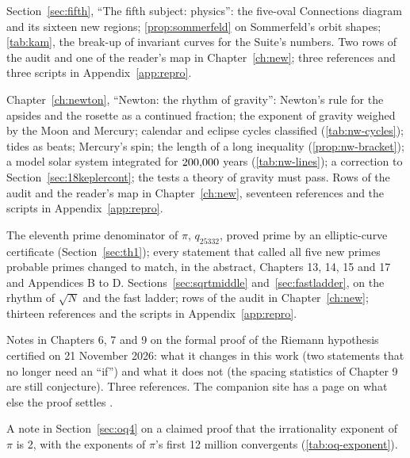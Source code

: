 \begin{description}[style=nextline,leftmargin=2em]
\item[\revE{}] Section~\ref{sec:fifth}, ``The fifth subject: physics'': the five-oval Connections diagram and its sixteen new regions; \cref{prop:sommerfeld} on Sommerfeld's orbit shapes; \cref{tab:kam}, the break-up of invariant curves for the Suite's numbers. Two rows of the audit and one of the reader's map in Chapter~\ref{ch:new}; three references and three scripts in Appendix~\ref{app:repro}.
\item[\revF{}] Chapter~\ref{ch:newton}, ``Newton: the rhythm of gravity'': Newton's rule for the apsides and the rosette as a continued fraction; the exponent of gravity weighed by the Moon and Mercury; calendar and eclipse cycles classified (\cref{tab:nw-cycles}); tides as beats; Mercury's spin; the length of a long inequality (\cref{prop:nw-bracket}); a model solar system integrated for $200{,}000$ years (\cref{tab:nw-lines}); a correction to Section~\ref{sec:18keplercont}; the tests a theory of gravity must pass. Rows of the audit and the reader's map in Chapter~\ref{ch:new}, seventeen references and the scripts in Appendix~\ref{app:repro}.
\item[\revG{}] The eleventh prime denominator of $\pi$, $q_{25332}$, proved prime by an elliptic-curve certificate (Section~\ref{sec:th1}); every statement that called all five new primes probable primes changed to match, in the abstract, Chapters 13, 14, 15 and 17 and Appendices B to D. Sections~\ref{sec:sqrtmiddle} and~\ref{sec:fastladder}, on the rhythm of $\sqrt N$ and the fast ladder; rows of the audit in Chapter~\ref{ch:new}; thirteen references and the scripts in Appendix~\ref{app:repro}.
\item[\revH{}] Notes in Chapters 6, 7 and 9 on the formal proof of the Riemann hypothesis certified on 21 November 2026: what it changes in this work (two statements that no longer need an ``if'') and what it does not (the spacing statistics of Chapter 9 are still conjecture). Three references. The companion site has a page on what else the proof settles \citep{RhythmSite}.
\item[\revI{}] A note in Section~\ref{sec:oq4} on a claimed proof that the irrationality exponent of $\pi$ is 2, with the exponents of $\pi$'s first 12 million convergents (\cref{tab:oq-exponent}).
\end{description}

\cleardoublepage
\tableofcontents*
\clearpage
\listoffigures*
\clearpage
\listoftables*
